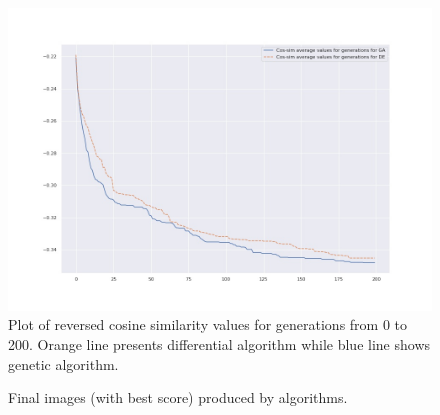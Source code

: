 \documentclass[12pt,a4paper,openany]{book}
\begin{document}
\begin{figure}[H]
    \centering
    \includegraphics[scale=0.45]{figs/avg_both_yellowcar.jpg}
    \caption{Plot of reversed cosine similarity values for generations from 0 to 200. Orange line presents differential algorithm while blue line shows genetic algorithm.}\label{Fig:STYLEGAN}
\end{figure}

\begin{figure}[H]
    \centering
    \qquad
    \caption{Final images (with best score) produced by algorithms.}%
    \label{fig:example}%
\end{figure}
\end{document}
